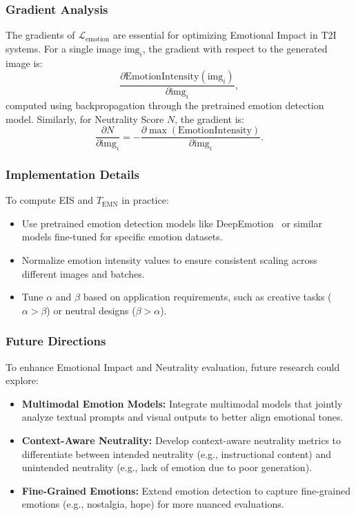 \subsubsection{Gradient Analysis}
The gradients of \(\mathcal{L}_{\text{emotion}}\) are essential for optimizing Emotional Impact in T2I systems. For a single image \(\text{img}_i\), the gradient with respect to the generated image is:
\[
\frac{\partial \text{EmotionIntensity}(\text{img}_i)}{\partial \text{img}_i},
\]
computed using backpropagation through the pretrained emotion detection model. Similarly, for Neutrality Score \(N\), the gradient is:
\[
\frac{\partial N}{\partial \text{img}_i} = - \frac{\partial \max(\text{EmotionIntensity})}{\partial \text{img}_i}.
\]

\subsubsection{Implementation Details}
To compute EIS and \(T_{\text{EMN}}\) in practice:
\begin{itemize}
    \item Use pretrained emotion detection models like DeepEmotion~\cite{abidin2018deepemotion} or similar models fine-tuned for specific emotion datasets.
    \item Normalize emotion intensity values to ensure consistent scaling across different images and batches.
    \item Tune \(\alpha\) and \(\beta\) based on application requirements, such as creative tasks (\(\alpha > \beta\)) or neutral designs (\(\beta > \alpha\)).
\end{itemize}

\subsubsection{Future Directions}
To enhance Emotional Impact and Neutrality evaluation, future research could explore:
\begin{itemize}
    \item \textbf{Multimodal Emotion Models:} Integrate multimodal models that jointly analyze textual prompts and visual outputs to better align emotional tones.
    \item \textbf{Context-Aware Neutrality:} Develop context-aware neutrality metrics to differentiate between intended neutrality (e.g., instructional content) and unintended neutrality (e.g., lack of emotion due to poor generation).
    \item \textbf{Fine-Grained Emotions:} Extend emotion detection to capture fine-grained emotions (e.g., nostalgia, hope) for more nuanced evaluations.
\end{itemize}


